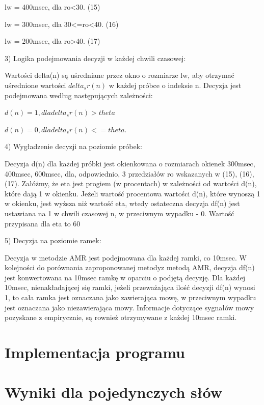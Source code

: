 \documentclass[eng,printmode]{mgr}
\begin{document}
  lw = 400msec, dla ro<30. (15)
  
  lw = 300msec, dla 30<=ro<40. (16)
  
  lw = 200msec, dla ro>40. (17)
  
  
 3) Logika podejmowania decyzji w każdej chwili czasowej:
 
 Wartości delta(n) są uśredniane przez okno o rozmiarze lw, aby otrzymać uśrednione wartości $delta_sr(n)$ w każdej próbce o indeksie n. Decyzja jest podejmowana według następujących zależności:
 
 $d(n) = 1, dla  delta_sr(n)>theta
$

$ 
 d(n) = 0, dla  delta_sr(n)<=theta.
 $
 
 4) Wygładzenie decyzji na poziomie próbek:
 
 Decyzja d(n) dla każdej próbki jest okienkowana o rozmiarach okienek 300msec, 400msec, 600msec, dla, odpowiednio, 3 przedziałów ro wskazanych w (15), (16), (17). Załóżmy, że eta jest progiem (w procentach) w zależności od wartości d(n), które dają 1 w okienku. Jeżeli wartość procentowa wartości d(n), które wynoszą 1 w okienku, jest wyższa niż wartość eta, wtedy ostateczna decyzja df(n) jest ustawiana na 1 w chwili czasowej n, w przeciwnym wypadku - 0. Wartość przypisana dla eta to 60%
 
 5) Decyzja na poziomie ramek:
 
 Decyzja w metodzie AMR jest podejmowana dla każdej ramki, co 10msec. W kolejności do porównania zaproponowanej metodyz metodą AMR, decyzja df(n) jest konwertowana na 10msec ramkę w oparciu o podjętą decyzję. Dla każdej 10msec, nienakładającej się ramki, jeżeli przeważająca ilość decyzji df(n) wynosi 1, to cała ramka jest oznaczana jako zawierająca mowę, w przeciwnym wypadku jest oznaczana jako niezawierająca mowy. Informacje dotyczące sygnałów mowy pozyskane z empirycznie, są rownież otrzymywane z każdej 10msec ramki.
  
 

\chapter{Implementacja programu}

\chapter{Wyniki dla pojedynczych słów}
\end{document}
